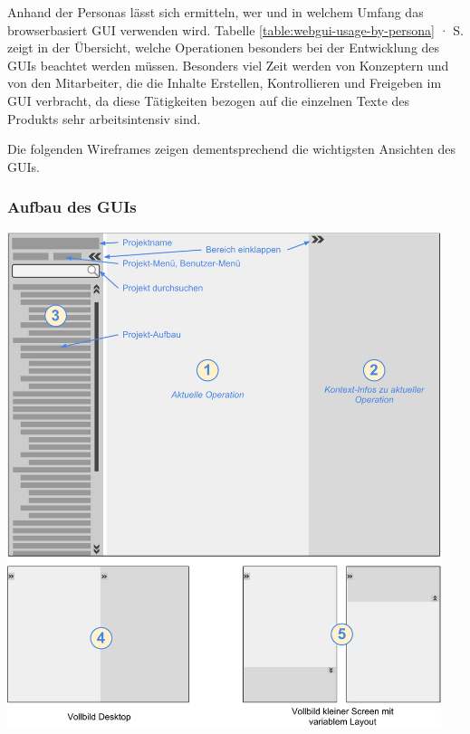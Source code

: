 Anhand der Personas lässt sich ermitteln, wer und in welchem Umfang das browserbasiert GUI verwenden wird. Tabelle \ref{table:webgui-usage-by-persona} · S.\pageref{table:webgui-usage-by-persona} zeigt in der Übersicht, welche Operationen besonders bei der Entwicklung des GUIs beachtet werden müssen. Besonders viel Zeit werden von Konzeptern und von den Mitarbeiter, die die Inhalte Erstellen, Kontrollieren und Freigeben im GUI verbracht, da diese Tätigkeiten bezogen auf die einzelnen Texte des Produkts sehr arbeitsintensiv sind.

\bigskip

Die folgenden Wireframes zeigen dementsprechend die wichtigsten Ansichten des GUIs.

\pagebreak

\subsubsection{Aufbau des GUIs}\label{l:gui-aufbau}

\begin{center}
\includegraphics[width=0.95\textwidth]{media/GUIAufbau.pdf}
\label{chart:gui-aufbau}
\end{center}

